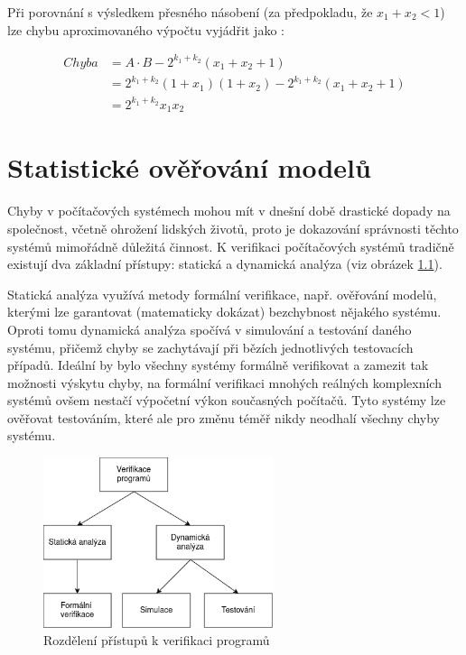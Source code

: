 Při porovnání s výsledkem přesného násobení (za předpokladu, že $x_1 + x_2 < 1$) lze chybu aproximovaného výpočtu vyjádřit jako \cite{approx_mult_survey}:

\begin{equation}
    \begin{array}{rl}
       Chyba & = A \cdot B - 2^{k_1+k_2}(x_1+x_2+1) \\
             & = 2^{k_1+k_2}(1+x_1)(1+x_2)-2^{k_1+k_2}(x_1+x_2+1) \\
             & = 2^{k_1+k_2}x_1x_2
    \end{array}
\end{equation}

\chapter{Statistické ověřování modelů}
\label{smc}
Chyby v počítačových systémech mohou mít v dnešní době drastické dopady na společnost, včetně ohrožení lidských životů, proto je dokazování správnosti těchto systémů mimořádně důležitá činnost. K verifikaci počítačových systémů tradičně existují dva základní přístupy: statická a dynamická analýza (viz obrázek \ref{fig:verifikace_rozdeleni}).

Statická analýza využívá metody formální verifikace, např. ověřování modelů, kterými lze garantovat (matematicky dokázat) bezchybnost nějakého systému. Oproti tomu dynamická analýza spočívá v simulování a testování daného systému, přičemž chyby se zachytávají při bězích jednotlivých testovacích případů. Ideální by bylo všechny systémy formálně verifikovat a zamezit tak možnosti výskytu chyby, na formální verifikaci mnohých reálných komplexních systémů ovšem nestačí výpočetní výkon současných počítačů. Tyto systémy lze ověřovat testováním, které ale pro změnu téměř nikdy neodhalí všechny chyby systému.

\begin{figure}[H]
    \centering
    \includegraphics[width=0.6\textwidth]{obrazky-figures/verifikace_rozdeleni.png}
    \caption{Rozdělení přístupů k verifikaci programů}
    \label{fig:verifikace_rozdeleni}
\end{figure}


